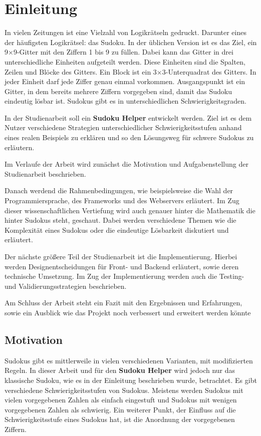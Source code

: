 
\chapter{Einleitung}
In vielen Zeitungen ist eine Vielzahl von Logikrätseln gedruckt. Darunter eines der häufigsten Logikrätsel: das Sudoku.
In der üblichen Version ist es das Ziel, ein 9×9-Gitter mit den Ziffern 1 bis 9 zu füllen. Dabei kann das Gitter in drei unterschiedliche Einheiten aufgeteilt werden. Diese Einheiten sind die Spalten, Zeilen und Blöcke des Gitters. Ein Block ist ein 3×3-Unterquadrat des Gitters. In jeder Einheit darf jede Ziffer genau einmal vorkommen.
Ausgangspunkt ist ein Gitter, in dem bereits mehrere Ziffern vorgegeben sind, damit das Sudoku eindeutig lösbar ist. Sudokus gibt es in unterschiedlichen Schwierigkeitsgraden. 

In der Studienarbeit soll ein \textbf{Sudoku Helper} entwickelt werden. Ziel ist es dem Nutzer verschiedene Strategien unterschiedlicher Schwierigkeitsstufen anhand eines realen Beispiels zu erklären und so den Lösungsweg für schwere Sudokus zu erläutern.

Im Verlaufe der Arbeit wird zunächst die Motivation und Aufgabenstellung der Studienarbeit beschrieben. 

Danach werdend die Rahmenbedingungen, wie beispielsweise die Wahl der Programmiersprache, des Frameworks und des Webservers erläutert. Im Zug dieser wissenschaftlichen Vertiefung wird auch genauer hinter die Mathematik die hinter Sudokus steht, geschaut. Dabei werden verschiedene Themen wie die Komplexität eines Sudokus oder die eindeutige Lösbarkeit diskutiert und erläutert.

Der nächste größere Teil der Studienarbeit ist die Implementierung. Hierbei werden Designentscheidungen für Front- und Backend erläutert, sowie deren technische Umsetzung. Im Zug der Implementierung werden auch die Testing- und Validierungsstrategien beschrieben.

Am Schluss der Arbeit steht ein Fazit mit den Ergebnissen und Erfahrungen, sowie ein Ausblick wie das Projekt noch verbessert und erweitert werden könnte
 

\section{Motivation}
Sudokus gibt es mittlerweile in vielen verschiedenen Varianten, mit modifizierten Regeln. In dieser Arbeit und für den \textbf{Sudoku Helper} wird jedoch nur das klassische Sudoku, wie es in der Einleitung beschrieben wurde, betrachtet. Es gibt verschiedene Schwierigkeitsstufen von Sudokus. Meistens werden Sudokus mit vielen vorgegebenen Zahlen als einfach eingestuft und Sudokus mit wenigen vorgegebenen Zahlen als schwierig. Ein weiterer Punkt, der Einfluss auf die Schwierigkeitsstufe eines Sudokus hat, ist die Anordnung der vorgegebenen Ziffern.

